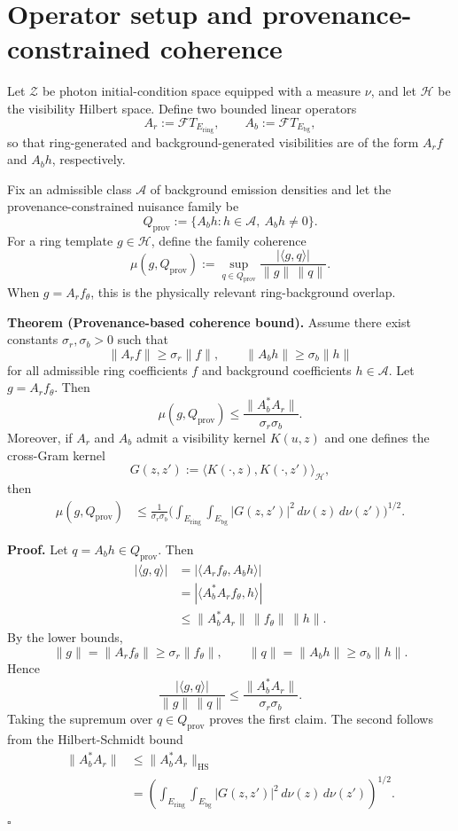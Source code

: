\documentclass[10pt,letterpaper,twocolumn]{article}
\begin{document}
\section{Operator setup and provenance-constrained coherence}

Let $\mathcal Z$ be photon initial-condition space equipped with a measure $\nu$, and let $\mathcal H$
be the visibility Hilbert space. Define two bounded linear operators
\[
A_r := \mathcal F T_{E_{\mathrm{ring}}}, \qquad A_b := \mathcal F T_{E_{\mathrm{bg}}},
\]
so that ring-generated and background-generated visibilities are of the form $A_r f$ and $A_b h$,
respectively.

Fix an admissible class $\mathcal A$ of background emission densities and let the provenance-constrained
nuisance family be
\[
Q_{\mathrm{prov}} := \{A_b h : h \in \mathcal A,\ A_b h \neq 0\}.
\]
For a ring template $g \in \mathcal H$, define the family coherence
\[
\mu(g,Q_{\mathrm{prov}})
:=
\sup_{q\in Q_{\mathrm{prov}}}
\frac{|\langle g,q\rangle|}{\|g\|\,\|q\|}.
\]
When $g = A_r f_\theta$, this is the physically relevant ring-background overlap.

\par\smallskip\noindent{}\textbf{Theorem (Provenance-based coherence bound).}
Assume there exist constants $\sigma_r,\sigma_b>0$ such that
\[
\|A_r f\| \ge \sigma_r \|f\|, \qquad \|A_b h\| \ge \sigma_b \|h\|
\]
for all admissible ring coefficients $f$ and background coefficients $h \in \mathcal A$.
Let $g = A_r f_\theta$. Then
\[
\mu(g,Q_{\mathrm{prov}})
\le
\frac{\|A_b^*A_r\|}{\sigma_r\sigma_b}.
\]
Moreover, if $A_r$ and $A_b$ admit a visibility kernel $K(u,z)$ and one defines the cross-Gram kernel
\[
G(z,z') := \langle K(\cdot,z),K(\cdot,z')\rangle_{\mathcal H},
\]
then
\begin{equation}
\begin{aligned}
\mu(g,Q_{\mathrm{prov}})
&\le
\frac{1}{\sigma_r\sigma_b}
\biggl(
\int_{E_{\mathrm{ring}}}\!\int_{E_{\mathrm{bg}}}
|G(z,z')|^2\,d\nu(z)\,d\nu(z')
\biggr)^{1/2}.
\end{aligned}
\end{equation}

\par\smallskip\noindent{}\textbf{Proof.} Let $q=A_b h \in Q_{\mathrm{prov}}$. Then
\[
\begin{aligned}
|\langle g,q\rangle|
&= |\langle A_r f_\theta, A_b h\rangle| \\
&= |\langle A_b^*A_r f_\theta, h\rangle| \\
&\le \|A_b^*A_r\|\,\|f_\theta\|\,\|h\|.
\end{aligned}
\]
By the lower bounds,
\[
\|g\|=\|A_r f_\theta\|\ge \sigma_r\|f_\theta\|,
\qquad
\|q\|=\|A_b h\|\ge \sigma_b\|h\|.
\]
Hence
\[
\frac{|\langle g,q\rangle|}{\|g\|\,\|q\|}
\le
\frac{\|A_b^*A_r\|}{\sigma_r\sigma_b}.
\]
Taking the supremum over $q \in Q_{\mathrm{prov}}$ proves the first claim. The second follows from the Hilbert-Schmidt bound
\[
\begin{aligned}
\|A_b^*A_r\|
&\le \|A_b^*A_r\|_{\mathrm{HS}} \\
&= \left(
\int_{E_{\mathrm{ring}}}\!\int_{E_{\mathrm{bg}}}
|G(z,z')|^2\,d\nu(z)\,d\nu(z')
\right)^{1/2}.
\end{aligned}
\]
\hfill$\square$
\end{document}
